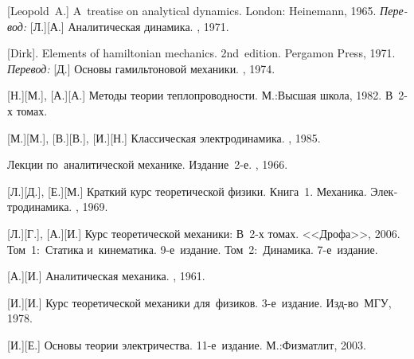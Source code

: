 \begin{thebibliography}{123}
\begin{otherlanguage}{russian}
[Leopold~A.] A~treatise on analytical dynamics.
London: Heinemann, 1965. 
\emph{Перевод:} [Л.][А.] Аналитическая динамика. \naukapublisher, 1971. 

[Dirk]. Elements of hamiltonian mechanics. 2nd~edition. Pergamon Press, 1971. 
\emph{Перевод:} [Д.] Основы гамильтоновой механики. \naukapublisher, 1974. 

[Н.][М.], [А.][А.] Методы теории теплопроводности. М.:\;Высшая школа, 1982. В~2\hbox{-}х томах.

[М.][М.], [В.][В.], [И.][Н.] Классическая электродинамика. \naukapublisher, 1985. 

Лекции по~аналитической механике.
Издание~2\hbox{-}е.
\naukapublisher, 1966.

[Л.][Д.], [Е.][М.] Краткий курс теоретической физики. Книга~1. Механика. Электродинамика. \naukapublisher, 1969. 

[Л.][Г.], [А.][И.] Курс теоретической механики: В~2\hbox{-}х томах.
<<Дрофа>>, 2006.
%
Том~1:~Статика и~кинематика.
9\hbox{-}е~издание.
%
Том~2:~Динамика.
7\hbox{-}е~издание.

[А.][И.]
Аналитическая механика.
\fizmatgiz, 1961.

[И.][И.] Курс теоретической механики для~физиков. 3\hbox{-}е~издание. Изд\hbox{-}во~МГУ, 1978. 

[И.][Е.] %
Основы теории электричества. 11\hbox{-}е~издание. М.:\;Физматлит, 2003.


\end{otherlanguage}
\end{thebibliography}
